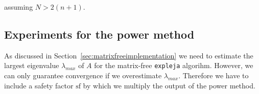 \documentclass{scrartcl}
\begin{document}
	assuming $N>2(n+1)$. %
	\subsection{Experiments for the power method}
	As discussed in Section~\ref{sec:matrixfreeimplementation} we need to estimate the largest eigenvalue $\lambda_{max}$ of $A$ for the matrix-free \texttt{expleja} algorihm. However, we can only guarantee convergence if we overestimate $\lambda_{max}$. Therefore we have to include a safety factor $\text{sf}$ by which we multiply the output of the power method. 
	
\end{document}
